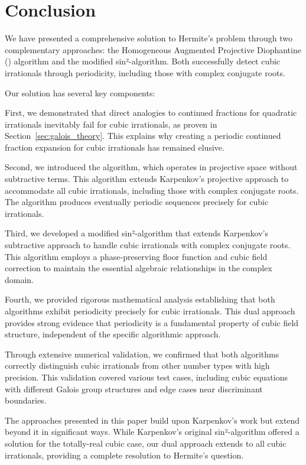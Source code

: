 \section{Conclusion}\label{sec:conclusion}

We have presented a comprehensive solution to Hermite's problem through two complementary approaches: the Homogeneous Augmented Projective Diophantine (\HAPD) algorithm and the modified sin²-algorithm. Both successfully detect cubic irrationals through periodicity, including those with complex conjugate roots.

Our solution has several key components:

First, we demonstrated that direct analogies to continued fractions for quadratic irrationals inevitably fail for cubic irrationals, as proven in Section~\ref{sec:galois_theory}. This explains why creating a periodic continued fraction expansion for cubic irrationals has remained elusive.

Second, we introduced the \HAPD{} algorithm, which operates in projective space without subtractive terms. This algorithm extends Karpenkov's projective approach to accommodate all cubic irrationals, including those with complex conjugate roots. The \HAPD{} algorithm produces eventually periodic sequences precisely for cubic irrationals.

Third, we developed a modified sin²-algorithm that extends Karpenkov's subtractive approach to handle cubic irrationals with complex conjugate roots. This algorithm employs a phase-preserving floor function and cubic field correction to maintain the essential algebraic relationships in the complex domain.

Fourth, we provided rigorous mathematical analysis establishing that both algorithms exhibit periodicity precisely for cubic irrationals. This dual approach provides strong evidence that periodicity is a fundamental property of cubic field structure, independent of the specific algorithmic approach.

Through extensive numerical validation, we confirmed that both algorithms correctly distinguish cubic irrationals from other number types with high precision. This validation covered various test cases, including cubic equations with different Galois group structures and edge cases near discriminant boundaries.

The approaches presented in this paper build upon Karpenkov's work \cite{Karpenkov2019, Karpenkov2022} but extend beyond it in significant ways. While Karpenkov's original sin²-algorithm offered a solution for the totally-real cubic case, our dual approach extends to all cubic irrationals, providing a complete resolution to Hermite's question.

